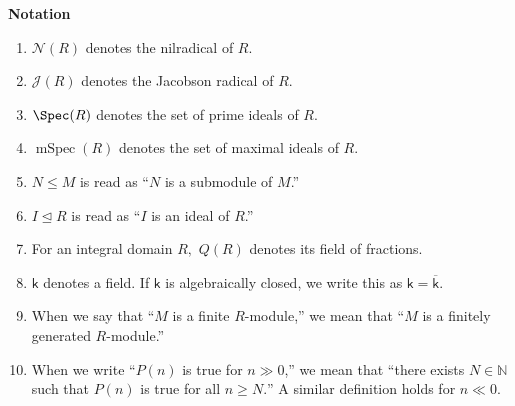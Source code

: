 \documentclass[12pt]{article}	%
\DeclareMathOperator{\mSpec}{mSpec}
\begin{document}


\coverpage

\updated{\today}

\thispagestyle{empty}
\tableofcontents
\newpage
\pagestyle{fancy}
\setcounter{page}{1}

\textbf{Notation}
\begin{enumerate}
	\item $\mathcal{N}(R)$ denotes the nilradical of $R.$
	\item $\mathcal{J}(R)$ denotes the Jacobson radical of $R.$
	\item $\Spec(R)$ denotes the set of prime ideals of $R.$
	\item $\mSpec(R)$ denotes the set of maximal ideals of $R.$
	\item $N \le M$ is read as ``$N$ is a submodule of $M$.''
	\item $I \unlhd R$ is read as ``$I$ is an ideal of $R$.''
	\item For an integral domain $R,$ $Q(R)$ denotes its field of fractions.
	\item $\mathsf{k}$ denotes a field. If $\mathsf{k}$ is algebraically closed, we write this as $\mathsf{k} = \overline{\mathsf{k}}.$ 
	\item When we say that ``$M$ is a finite $R$-module,'' we mean that ``$M$ is a finitely generated $R$-module.''
	\item When we write ``$P(n)$ is true for $n \gg 0$,'' we mean that ``there exists $N \in \mathbb{N}$ such that $P(n)$ is true for all $n \ge N.$'' A similar definition holds for $n \ll 0.$
\end{enumerate}
\end{document}
